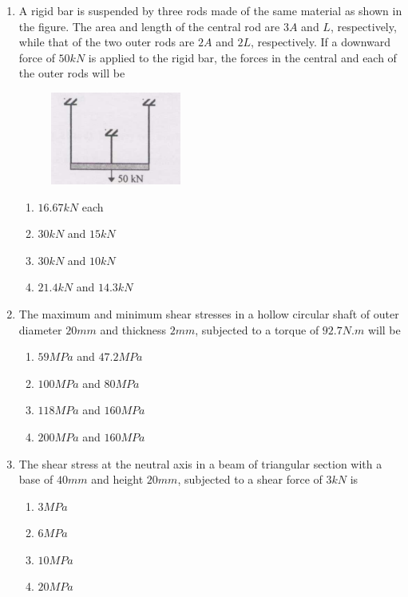 \documentclass[journal,12pt,onecolumn]{IEEEtran}
\theoremstyle{remark}
\begin{document}
\begin{enumerate}
\item A rigid bar is suspended by three rods made of the same material as shown in the figure. The area and length of the central rod are $3A$ and $L$, respectively, while that of the two outer rods are $2A$ and $2L$, respectively. If a downward force of $50 kN$ is applied to the rigid bar, the forces in the central and each of the outer rods will be

\hfill{}
\begin{figure}[H]
\centering
\includegraphics[width=0.3\columnwidth]{figs/q31.png}
\caption*{}
\label{fig:Q.31}
\end{figure}
\begin{enumerate}
\item $16.67 kN$ each
\item $30 kN$ and $15 kN$
\item $30 kN$ and $10 kN$
\item $21.4 kN$ and $14.3 kN$
\end{enumerate}

\item The maximum and minimum shear stresses in a hollow circular shaft of outer diameter $20 mm$ and thickness $2 mm$, subjected to a torque of $92.7 N.m$ will be

\hfill{}

\begin{enumerate}
\item $59 MPa$ and $47.2 MPa$
\item $100 MPa$ and $80 MPa$
\item $118 MPa$ and $160 MPa$
\item $200 MPa$ and $160 MPa$
\end{enumerate}

\item The shear stress at the neutral axis in a beam of triangular section with a base of $40 mm$ and height $20 mm$, subjected to a shear force of $3 kN$ is

\hfill{}

\begin{enumerate}
\item $3 MPa$
\item $6 MPa$
\item $10 MPa$
\item $20 MPa$
\end{enumerate}


\end{enumerate}
\end{document}

